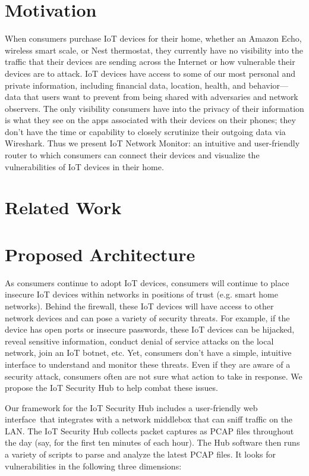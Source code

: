 \section{Motivation}
When consumers purchase IoT devices for their home, whether an Amazon Echo, wireless smart scale, or Nest thermostat, they currently have no visibility into the traffic that their devices are sending across the Internet or how vulnerable their devices are to attack. IoT devices have access to some of our most personal and private information, including financial data, location, health, and behavior––data that users want to prevent from being shared with adversaries and network observers. The only visibility consumers have into the privacy of their information is what they see on the apps associated with their devices on their phones; they don’t have the time or capability to closely scrutinize their outgoing data via Wireshark. Thus we present IoT Network Monitor: an intuitive and user-friendly router to which consumers can connect their devices and visualize the vulnerabilities of IoT devices in their home. 

\section{Related Work}

\section{Proposed Architecture}
As consumers continue to adopt IoT devices, consumers will continue to place insecure IoT devices within networks in positions of trust (e.g. smart home networks). Behind the firewall, these IoT devices will have access to other network devices and can pose a variety of security threats. For example, if the device has open ports or insecure passwords, these IoT devices can be hijacked, reveal sensitive information, conduct denial of service attacks on the local network, join an IoT botnet, etc. Yet, consumers don't have a simple, intuitive interface to understand and monitor these threats. Even if they are aware of a security attack, consumers often are not sure what action to take in response. We propose the IoT Security Hub to help combat these issues.

Our framework for the IoT Security Hub includes a user-friendly web interface that integrates with a network middlebox that can sniff traffic on the LAN. The IoT Security Hub collects packet captures as PCAP files throughout the day (say, for the first ten minutes of each hour). The Hub software then runs a variety of scripts to parse and analyze the latest PCAP files. It looks for vulnerabilities in the following three dimensions:

